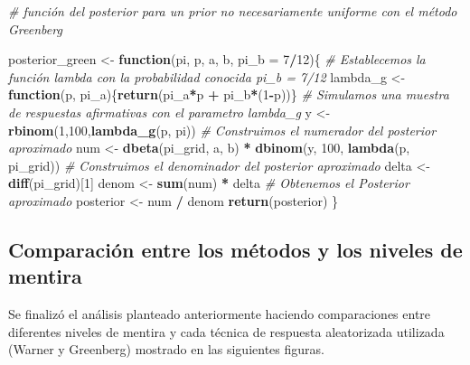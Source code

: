 \documentclass[
]{article}
\newenvironment{Shaded}{\begin{snugshade}}{\end{snugshade}}
\newcommand{\AttributeTok}[1]{\textcolor[rgb]{0.13,0.29,0.53}{#1}}
\newcommand{\CommentTok}[1]{\textcolor[rgb]{0.56,0.35,0.01}{\textit{#1}}}
\newcommand{\ControlFlowTok}[1]{\textcolor[rgb]{0.13,0.29,0.53}{\textbf{#1}}}
\newcommand{\DecValTok}[1]{\textcolor[rgb]{0.00,0.00,0.81}{#1}}
\newcommand{\FunctionTok}[1]{\textcolor[rgb]{0.13,0.29,0.53}{\textbf{#1}}}
\newcommand{\NormalTok}[1]{#1}
\newcommand{\OtherTok}[1]{\textcolor[rgb]{0.56,0.35,0.01}{#1}}
\newcommand{\SpecialCharTok}[1]{\textcolor[rgb]{0.81,0.36,0.00}{\textbf{#1}}}
\begin{document}
\begin{Shaded}
\begin{Highlighting}[]
\CommentTok{\# función del posterior para un prior no necesariamente uniforme con el método Greenberg}

\NormalTok{posterior\_green }\OtherTok{\textless{}{-}} \ControlFlowTok{function}\NormalTok{(pi, p, a, b, }\AttributeTok{pi\_b =} \DecValTok{7}\SpecialCharTok{/}\DecValTok{12}\NormalTok{)\{}
  \CommentTok{\# Establecemos la función lambda con la probabilidad conocida pi\_b = 7/12}
\NormalTok{  lambda\_g }\OtherTok{\textless{}{-}} \ControlFlowTok{function}\NormalTok{(p, pi\_a)\{}\FunctionTok{return}\NormalTok{(pi\_a}\SpecialCharTok{*}\NormalTok{p }\SpecialCharTok{+}\NormalTok{ pi\_b}\SpecialCharTok{*}\NormalTok{(}\DecValTok{1}\SpecialCharTok{{-}}\NormalTok{p))\}}
  \CommentTok{\# Simulamos una muestra de respuestas afirmativas con el parametro lambda\_g}
\NormalTok{  y }\OtherTok{\textless{}{-}} \FunctionTok{rbinom}\NormalTok{(}\DecValTok{1}\NormalTok{,}\DecValTok{100}\NormalTok{,}\FunctionTok{lambda\_g}\NormalTok{(p, pi))}
  \CommentTok{\# Construimos el numerador del posterior aproximado}
\NormalTok{  num }\OtherTok{\textless{}{-}} \FunctionTok{dbeta}\NormalTok{(pi\_grid, a, b) }\SpecialCharTok{*} \FunctionTok{dbinom}\NormalTok{(y, }\DecValTok{100}\NormalTok{, }\FunctionTok{lambda}\NormalTok{(p, pi\_grid))}
  \CommentTok{\# Construimos el denominador del posterior aproximado}
\NormalTok{  delta }\OtherTok{\textless{}{-}} \FunctionTok{diff}\NormalTok{(pi\_grid)[}\DecValTok{1}\NormalTok{] }
\NormalTok{  denom }\OtherTok{\textless{}{-}} \FunctionTok{sum}\NormalTok{(num) }\SpecialCharTok{*}\NormalTok{ delta}
  \CommentTok{\# Obtenemos el Posterior aproximado}
\NormalTok{  posterior }\OtherTok{\textless{}{-}}\NormalTok{ num }\SpecialCharTok{/}\NormalTok{ denom}
  \FunctionTok{return}\NormalTok{(posterior)}
\NormalTok{\}}
\end{Highlighting}
\end{Shaded}

\clearpage

\subsection{Comparación entre los métodos y los niveles de mentira}\label{Objetivo-4}

Se finalizó el análisis planteado anteriormente haciendo comparaciones entre diferentes niveles de mentira y cada técnica de respuesta aleatorizada utilizada (Warner y Greenberg) mostrado en las siguientes figuras.
\end{document}
